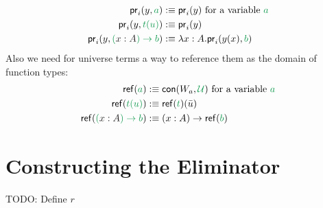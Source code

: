 \documentclass[12pt,headings=optiontohead,openany,oneside,a4paper]{book}
\theoremstyle{definition}
\newcommand{\UU}{\mathcal{U}}
\newcommand{\pr}{\mathsf{pr}}
\newcommand{\gr}[1]{{\color{ForestGreen}#1}}
\newcommand{\grm}[1]{\ensuremath{\gr{#1}}}
\newcommand{\blm}[1]{\ensuremath{{\color{Black}#1}}}
\newcommand{\contwo}[2]{\mathsf{con}(#1,\grm{#2})}
\begin{document}
\begin{defn}
\begin{align*}
\pr_i(y, \grm{a}) &:\equiv \pr_i(y) \text{ for a variable \grm{a}} \\
\pr_i(y, \grm{t(u)}) &:\equiv \pr_i(y) \\ %
\pr_i(y, \grm{(\blm{x : A}) \to b}) &:\equiv \lambda x : A. \pr_i(y(x), \grm{b})
\end{align*}
Also we need for universe terms a way to reference them as the domain of function
types:
\begin{align*}
\mathsf{ref}(\grm{a}) &:\equiv \contwo{W_a}{\UU} \text{ for a variable \grm{a}} \\
\mathsf{ref}(\grm{t(u)}) &:\equiv \mathsf{ref}(\grm{t})(\bar{u}) \\
\mathsf{ref}(\grm{(\blm{x : A}) \to b}) &:\equiv (x : A) \to \mathsf{ref}(\grm{b})
\end{align*}
\end{defn}

\section{Constructing the Eliminator}

TODO: Define $r$



\end{document}
